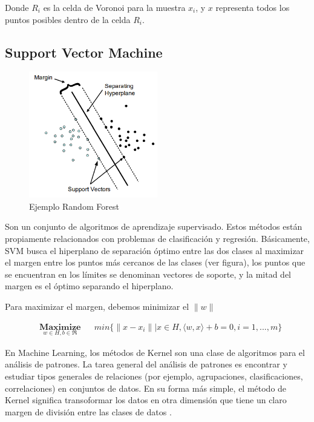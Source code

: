 \documentclass[11pt]{report}
\newcommand{\Maximize}[1]{\underset{#1}{\mathbf{Maximize}}}
\begin{document}
Donde $R_i$ es la celda de Voronoi para la muestra $x_i$, y $x$ representa todos los puntos posibles dentro de la celda $R_i$.

\subsection {Support Vector Machine}
\begin{figure}[H]
  \centering
    \includegraphics[width=0.5\textwidth]{support}
   \caption{Ejemplo Random Forest \cite{supportv}}
\end{figure}

Son un conjunto de algoritmos de aprendizaje supervisado. Estos métodos están propiamente relacionados con problemas de clasificación y regresión. Básicamente, SVM busca el hiperplano de separación óptimo entre las dos clases al maximizar el margen entre los puntos más cercanos de las clases (ver figura), los puntos que se encuentran en los límites se denominan vectores de soporte, y la mitad del margen es el óptimo separando el hiperplano.

Para maximizar el margen, debemos minimizar el $\parallel w \parallel$

\begin{equation}\label{formula:QPQC}
\begin{aligned}
&\Maximize{w \in H, b \in \Re} && min \{ \parallel x - x_i \parallel |x \in H, \langle w,x \rangle + b = 0, i = 1, ..., m \}
\end{aligned}
\end{equation}

En Machine Learning, los métodos de Kernel son una clase de algoritmos para el análisis de patrones. La tarea general del análisis de patrones es encontrar y estudiar tipos generales de relaciones (por ejemplo, agrupaciones, clasificaciones, correlaciones) en conjuntos de datos. En su forma más simple, el método de Kernel significa transoformar los datos en otra dimensión que tiene un claro margen de división entre las clases de datos \cite{kernel}.
\end{document}
